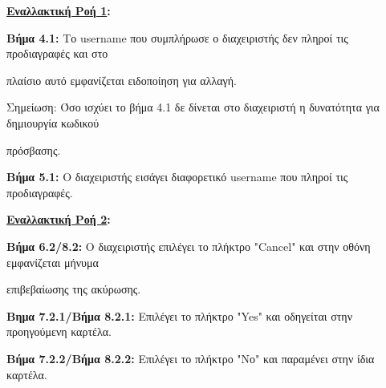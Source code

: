 \documentclass{article}
\begin{document}
 \vspace{0.2cm}

\textbf{\underline{Εναλλακτική Ροή 1}:} \newline
\par \textbf{Βήμα 4.1:} Το username που συμπλήρωσε ο διαχειριστής δεν πληροί τις προδιαγραφές και στο \par πλαίσιο αυτό εμφανίζεται ειδοποίηση για αλλαγή.

\vspace{0.2cm}

\par Σημείωση: Όσο ισχύει το βήμα 4.1 δε δίνεται στο διαχειριστή η δυνατότητα για δημιουργία κωδικού \par πρόσβασης.

\vspace{0.2cm}

\par \textbf{Βήμα 5.1:} Ο διαχειριστής εισάγει διαφορετικό username που πληροί τις προδιαγραφές.

\vspace{0.2cm}

\textbf{\underline{Εναλλακτική Ροή 2}:} \newline
\par \textbf{Βήμα 6.2/8.2:} Ο διαχειριστής επιλέγει το πλήκτρο "Cancel" και στην οθόνη εμφανίζεται μήνυμα \par επιβεβαίωσης της ακύρωσης.\

\vspace{0.2cm}

\par \textbf{Βημα 7.2.1/Βήμα 8.2.1:} Επιλέγει το πλήκτρο "Yes" και οδηγείται στην προηγούμενη καρτέλα.

\vspace{0.2cm}

\par \textbf{Βήμα 7.2.2/Βήμα 8.2.2:} Επιλέγει το πλήκτρο "Νο" και παραμένει στην ίδια καρτέλα.
\end{document}
